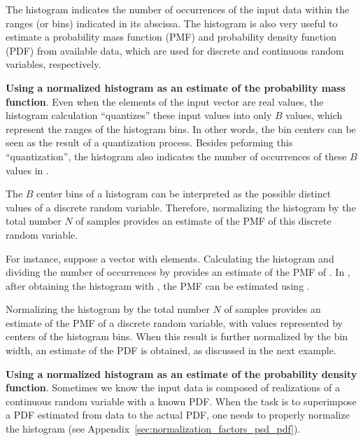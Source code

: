 The histogram indicates the number of occurrences of the input data within the ranges (or bins) indicated in its abscissa. The histogram is also very useful to estimate a probability mass function (PMF) and probability density function (PDF) from available data, 
which are used for discrete and continuous random variables, respectively. 

\bExample \textbf{Using a normalized histogram as an estimate of the probability mass function}.
Even when the elements of the input vector  are real values, the histogram calculation ``quantizes'' these input values
into only $B$ values, which represent the ranges of the histogram bins. In other words, the bin centers can
be seen as the result of a quantization process. Besides peforming this ``quantization'', the histogram
also indicates the number of occurrences of these
$B$ values in .

The $B$ center bins of a histogram can be interpreted as the possible distinct values
of a discrete random variable. Therefore, normalizing the histogram by the total number $N$ of samples
provides an estimate of the PMF of this discrete random variable.


For instance, suppose a vector  with  elements. 
Calculating the histogram and dividing the number of occurrences by  provides an estimate of the PMF of .
In \matlab, after obtaining the histogram with , the PMF can be estimated 
using .
\eExample 

Normalizing the histogram by the total number $N$ of samples provides an estimate of the PMF of a discrete random variable, with values represented by centers of the histogram bins. When this result is further normalized by the bin width, an estimate of the PDF is obtained, as discussed in the next example.

\bExample \textbf{Using a normalized histogram as an estimate of the probability density function}.
Sometimes we know the input data  is composed of realizations of a continuous random variable with a known PDF. 
When the task is to superimpose a PDF estimated from data to the actual PDF, one needs to properly normalize
the histogram (see Appendix~\ref{sec:normalization_factors_psd_pdf}).

